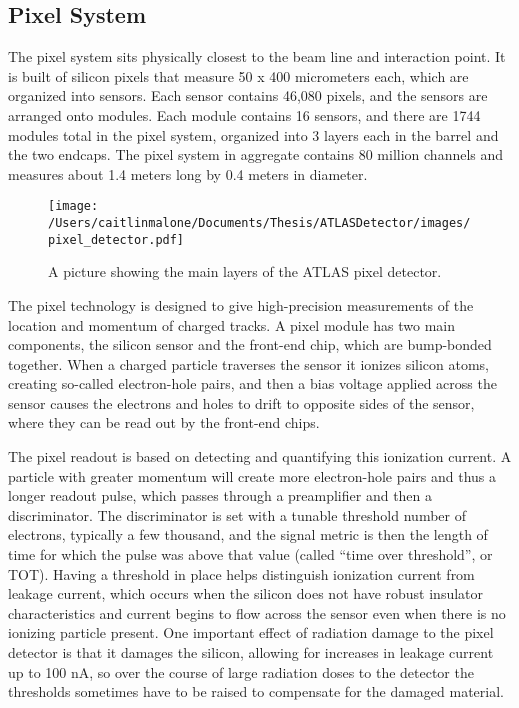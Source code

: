 \subsection{Pixel System}
\label{sec:pixel}
The pixel system sits physically closest to the beam line and interaction point.  It is built of silicon pixels that measure 50 x 400 micrometers each, which are organized into sensors.  Each sensor contains 46,080 pixels, and the sensors are arranged onto modules.  Each module contains 16 sensors, and there are 1744 modules total in the pixel system, organized into 3 layers each in the barrel and the two endcaps.  The pixel system in aggregate contains 80 million channels and measures about 1.4 meters long by 0.4 meters in diameter.

\begin{figure}
	\texttt{[image: /Users/caitlinmalone/Documents/Thesis/ATLASDetector/images/pixel\_detector.pdf]}
	\label{fig:inner_detector}  
	\caption{A picture showing the main layers of the ATLAS pixel detector.}
\end{figure}

The pixel technology is designed to give high-precision measurements of the location and momentum of charged tracks.  A pixel module has two main components, the silicon sensor and the front-end chip, which are bump-bonded together.  When a charged particle traverses the sensor it ionizes silicon atoms, creating so-called electron-hole pairs, and then a bias voltage applied across the sensor causes the electrons and holes to drift to opposite sides of the sensor, where they can be read out by the front-end chips.  

The pixel readout is based on detecting and quantifying this ionization current.  A particle with greater momentum will create more electron-hole pairs and thus a longer readout pulse, which passes through a preamplifier and then a discriminator.  The discriminator is set with a tunable threshold number of electrons, typically a few thousand, and the signal metric is then the length of time for which the pulse was above that value (called ``time over threshold'', or TOT).  Having a threshold in place helps distinguish ionization current from leakage current, which occurs when the silicon does not have robust insulator characteristics and current begins to flow across the sensor even when there is no ionizing particle present.  One important effect of radiation damage to the pixel detector is that it damages the silicon, allowing for increases in leakage current up to 100 nA, so over the course of large radiation doses to the detector the thresholds sometimes have to be raised to compensate for the damaged material.  


